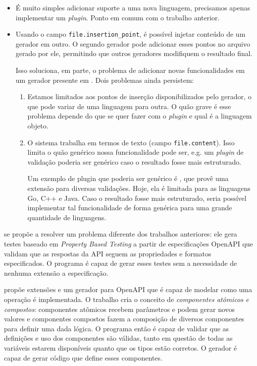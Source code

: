 \begin{itemize}
\item
  É muito simples adicionar suporte a uma nova linguagem, precisamos apenas
  implementar um \textit{plugin}. Ponto em comum com o trabalho anterior.
\item
  Usando o campo \texttt{file.insertion\_point}, é possível injetar conteúdo
  de um gerador em outro. O segundo gerador pode adicionar esses pontos no
  arquivo gerado por ele, permitindo que outros geradores modifiquem o resultado
  final.

  Isso soluciona, em parte, o problema de adicionar novas funcionalidades em
  um gerador presente em \cite{openapi:gen}. Dois problemas ainda persistem:

  \begin{enumerate}
  \item
    Estamos limitados aos pontos de inserção disponibilizados pelo gerador, o
    que pode variar de uma linguagem para outra. O quão grave é esse problema
    depende do que se quer fazer com o \textit{plugin} e qual é a linguagem objeto.
  \item
    O sistema trabalha em termos de texto (campo \texttt{file.content}). Isso
    limita o quão genérico nossa funcionalidade pode ser, e.g. um \textit{plugin} de
    validação poderia ser genérico caso o resultado fosse mais estruturado.

    Um exemplo de plugin que poderia ser genérico é \cite{envoy:protoc-gen-validate},
    que provê uma extensão para diversas validações. Hoje, ela é limitada para
    as linguagens Go, C++ e Java. Caso o resultado fosse mais estruturado, seria
    possível implementar tal funcionalidade de forma genérica para uma grande
    quantidade de linguagens.
  \end{enumerate}
\end{itemize}

\cite{9159071} se propõe a resolver um problema diferente dos trabalhos anteriores:
ele gera testes baseado em \textit{Property Based Testing} \cite{10.1145/351240.351266}
a partir de especificações OpenAPI que validam que as respostas da API seguem as
propriedades e formatos especificados. O programa é capaz de gerar esses testes
sem a necessidade de nenhuma extensão a especificação.

\cite{sferruzza:hal-01868498} propõe extensões e um gerador para OpenAPI que é
capaz de modelar como uma operação é implementada. O trabalho cria o conceito de
\textit{componentes atômicos e compostos}: componentes atômicos recebem parâmetros
e podem gerar novos valores e componentes compostos fazem a composição de diversos
componentes para definir uma dada lógica. O programa então é capaz de validar que
as definições e uso dos componentes são válidas, tanto em questão de todas as
variáveis estarem disponíveis quanto que os tipos estão corretos. O gerador é capaz
de gerar código que define esses componentes.


